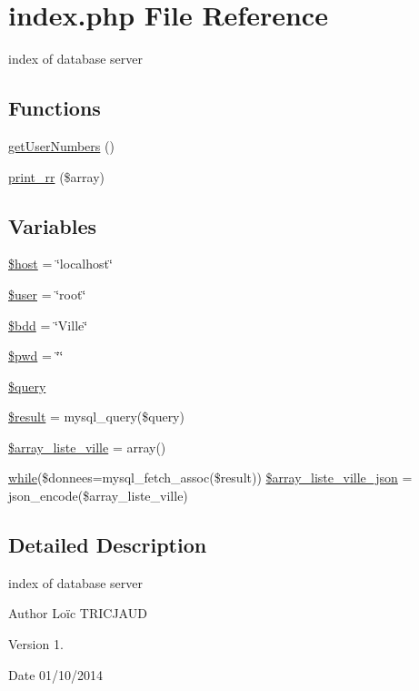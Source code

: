 \hypertarget{index_8php}{\section{index.\-php File Reference}
\label{index_8php}
}


index of database server  


\subsection*{Functions}
\begin{DoxyCompactItemize}
\item 
\hyperlink{index_8php_a4a38e55537f41e093dde868e1c5d7cd3}{get\-User\-Numbers} ()
\item 
\hyperlink{index_8php_a9bd2343fa51e8583eae478b815fba8c2}{print\-\_\-rr} (\$array)
\end{DoxyCompactItemize}
\subsection*{Variables}
\begin{DoxyCompactItemize}
\item 
\hyperlink{index_8php_a711797613cb863ca0756df789c396bf2}{\$host} = \char`\"{}localhost\char`\"{}
\item 
\hyperlink{index_8php_a598ca4e71b15a1313ec95f0df1027ca5}{\$user} = \char`\"{}root\char`\"{}
\item 
\hyperlink{index_8php_a94f91e878bce0991e2cd595c5dd79b3f}{\$bdd} = \char`\"{}Ville\char`\"{}
\item 
\hyperlink{index_8php_a12e4252e778952d356721bc655cff8c8}{\$pwd} = \char`\"{}\char`\"{}
\item 
\hyperlink{index_8php_af59a5f7cd609e592c41dc3643efd3c98}{\$query}
\item 
\hyperlink{index_8php_a112ef069ddc0454086e3d1e6d8d55d07}{\$result} = mysql\-\_\-query(\$query)
\item 
\hyperlink{index_8php_a8f00c580755c88b9190084e5128da4e3}{\$array\-\_\-liste\-\_\-ville} = array()
\item 
\hyperlink{extract_mcdo_8php_a4eebe21070c3a655a77e55ea3fe137f5}{while}(\$donnees=mysql\-\_\-fetch\-\_\-assoc(\$result)) \hyperlink{index_8php_afd0f4a07395f4989c1fe3b5e60dec1f7}{\$array\-\_\-liste\-\_\-ville\-\_\-json} = json\-\_\-encode(\$array\-\_\-liste\-\_\-ville)
\end{DoxyCompactItemize}


\subsection{Detailed Description}
index of database server \begin{DoxyAuthor}{Author}
Loïc T\-R\-I\-C\-J\-A\-U\-D 
\end{DoxyAuthor}
\begin{DoxyVersion}{Version}
1. 
\end{DoxyVersion}
\begin{DoxyDate}{Date}
01/10/2014 
\end{DoxyDate}



